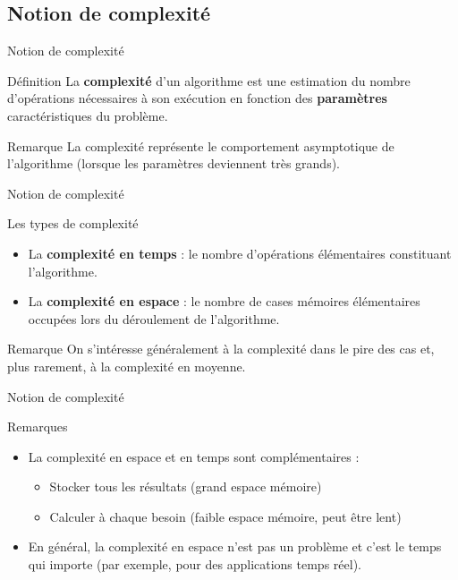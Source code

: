 \documentclass{beamer}
\begin{document}
\subsection{Notion de complexité}

\begin{frame}{Notion de complexité}
    \begin{block}{Définition}
        La \textbf{complexité} d'un algorithme est une estimation du nombre d'opérations nécessaires à son exécution en fonction des \textbf{paramètres} caractéristiques du problème.
    \end{block}
    \begin{exampleblock}{Remarque}
        La complexité représente le comportement asymptotique de l'algorithme (lorsque les paramètres deviennent très grands).
    \end{exampleblock}
\end{frame}

\begin{frame}{Notion de complexité}
\begin{block}{Les types de complexité}
  \begin{itemize}
    \item La \textbf{complexité en temps} : le nombre d'opérations élémentaires constituant l'algorithme.
    \item La \textbf{complexité en espace} : le nombre de cases mémoires élémentaires occupées lors du déroulement de l'algorithme.
  \end{itemize}
\end{block}

\begin{exampleblock}{Remarque}
On s'intéresse généralement à la complexité dans le pire des cas et, plus rarement, à la complexité en moyenne.
\end{exampleblock}
\end{frame}

\begin{frame}{Notion de complexité}
\begin{exampleblock}{Remarques}
\begin{itemize}
\item La complexité en espace et en temps sont complémentaires :
  \begin{itemize}
  \item Stocker tous les résultats (grand espace mémoire)
  \item Calculer à chaque besoin (faible espace mémoire, peut être lent)
  \end{itemize}
\item En général, la complexité en espace n'est pas un problème et c'est le temps qui importe (par exemple, pour des applications temps réel).
\end{itemize}
\end{exampleblock}
\end{frame}
\end{document}
